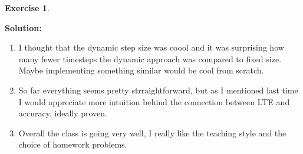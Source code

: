 \documentclass[a4paper,12pt]{scrartcl} %
\newenvironment{solution}
  {\par\color{answercolor}\textbf{Solution:}\ }
  {\par}
\newcounter{customcounter}
\theoremstyle{darktheorem}
\newtheorem{exercise}[customcounter]{Exercise}
\begin{document}
\begin{exercise}
\end{exercise}
\begin{solution}
    \begin{enumerate}
        \item I thought that the dynamic step size was coool and it was surprising how many fewer timesteps the dynamic
            approach was compared to fixed size. Maybe implementing something similar would be cool from scratch.
        \item So far everything seems pretty strraightforward, but as I mentioned last time I would appreciate more intuition behind
            the connection between LTE and accuracy, ideally proven.
        \item Overall the class is going very well, I really like the teaching style and the choice of homework problems.
    \end{enumerate}
\end{solution}
\end{document}
